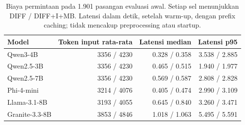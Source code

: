 \begin{table}[t]
\centering\small
\caption{Biaya permintaan pada 1.901 pasangan evaluasi awal. Setiap sel menunjukkan DIFF / DIFF+I+MB. Latensi dalam detik, setelah warm-up, dengan prefix caching; tidak mencakup preprocessing atau startup.}
\label{tab:cost}
\begin{tabular}{lrrr}
\toprule
Model & Token input rata-rata & Latensi median & Latensi p95 \\
\midrule
Qwen3-4B & 3356 / 4230 & 0.328 / 0.358 & 3.538 / 2.885 \\
Qwen2.5-3B & 3356 / 4230 & 0.465 / 0.515 & 1.940 / 1.977 \\
Qwen2.5-7B & 3356 / 4230 & 0.569 / 0.587 & 2.808 / 2.828 \\
Phi-4-mini & 3214 / 4076 & 0.405 / 0.474 & 2.990 / 3.109 \\
Llama-3.1-8B & 3193 / 4055 & 0.645 / 0.840 & 3.260 / 3.471 \\
Granite-3.3-8B & 3853 / 4846 & 1.018 / 1.063 & 5.495 / 5.591 \\
\bottomrule
\end{tabular}
\end{table}
